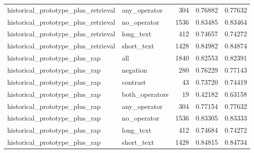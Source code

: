\begin{tabular}{llrrr}
historical_prototype_plus_retrieval & any_operator & 304 & 0.76882 & 0.77632 \\
historical_prototype_plus_retrieval & no_operator & 1536 & 0.83485 & 0.83464 \\
historical_prototype_plus_retrieval & long_text & 412 & 0.74657 & 0.74272 \\
historical_prototype_plus_retrieval & short_text & 1428 & 0.84982 & 0.84874 \\
historical_prototype_plus_rap & all & 1840 & 0.82553 & 0.82391 \\
historical_prototype_plus_rap & negation & 280 & 0.76229 & 0.77143 \\
historical_prototype_plus_rap & contrast & 43 & 0.73720 & 0.74419 \\
historical_prototype_plus_rap & both_operators & 19 & 0.42182 & 0.63158 \\
historical_prototype_plus_rap & any_operator & 304 & 0.77154 & 0.77632 \\
historical_prototype_plus_rap & no_operator & 1536 & 0.83305 & 0.83333 \\
historical_prototype_plus_rap & long_text & 412 & 0.74684 & 0.74272 \\
historical_prototype_plus_rap & short_text & 1428 & 0.84815 & 0.84734 \\
\bottomrule
\end{tabular}
